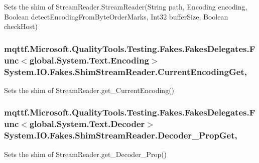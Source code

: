 Sets the shim of Stream\-Reader.\-Stream\-Reader(\-String path, Encoding encoding, Boolean detect\-Encoding\-From\-Byte\-Order\-Marks, Int32 buffer\-Size, Boolean check\-Host)

\hypertarget{class_system_1_1_i_o_1_1_fakes_1_1_shim_stream_reader_aea1b7de4f82394afa402bd6e9e1b8580}{
\subsubsection[{Current\-Encoding\-Get}]{\setlength{\rightskip}{0pt plus 5cm}mqttf.\-Microsoft.\-Quality\-Tools.\-Testing.\-Fakes.\-Fakes\-Delegates.\-Func$<$global.\-System.\-Text.\-Encoding$>$ System.\-I\-O.\-Fakes.\-Shim\-Stream\-Reader.\-Current\-Encoding\-Get\hspace{0.3cm}{\ttfamily [get]}, {\ttfamily [set]}}}\label{class_system_1_1_i_o_1_1_fakes_1_1_shim_stream_reader_aea1b7de4f82394afa402bd6e9e1b8580}


Sets the shim of Stream\-Reader.\-get\-\_\-\-Current\-Encoding()

\hypertarget{class_system_1_1_i_o_1_1_fakes_1_1_shim_stream_reader_a7bf372eb6860b79cf55c79d3e32bdc84}{
\subsubsection[{Decoder\-\_\-\-Prop\-Get}]{\setlength{\rightskip}{0pt plus 5cm}mqttf.\-Microsoft.\-Quality\-Tools.\-Testing.\-Fakes.\-Fakes\-Delegates.\-Func$<$global.\-System.\-Text.\-Decoder$>$ System.\-I\-O.\-Fakes.\-Shim\-Stream\-Reader.\-Decoder\-\_\-\-Prop\-Get\hspace{0.3cm}{\ttfamily [get]}, {\ttfamily [set]}}}\label{class_system_1_1_i_o_1_1_fakes_1_1_shim_stream_reader_a7bf372eb6860b79cf55c79d3e32bdc84}


Sets the shim of Stream\-Reader.\-get\-\_\-\-Decoder\-\_\-\-Prop()

